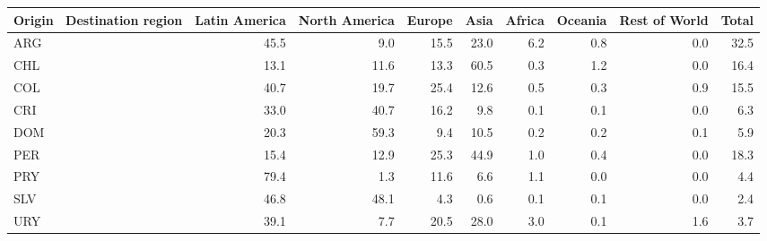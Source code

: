 \begin{tabular}{lrrrrrrrr}
\toprule
Origin \ Destination region & Latin America & North America & Europe & Asia & Africa & Oceania & Rest of World & Total \\
\midrule
ARG & 45.5 & 9.0 & 15.5 & 23.0 & 6.2 & 0.8 & 0.0 & 32.5 \\
CHL & 13.1 & 11.6 & 13.3 & 60.5 & 0.3 & 1.2 & 0.0 & 16.4 \\
COL & 40.7 & 19.7 & 25.4 & 12.6 & 0.5 & 0.3 & 0.9 & 15.5 \\
CRI & 33.0 & 40.7 & 16.2 & 9.8 & 0.1 & 0.1 & 0.0 & 6.3 \\
DOM & 20.3 & 59.3 & 9.4 & 10.5 & 0.2 & 0.2 & 0.1 & 5.9 \\
PER & 15.4 & 12.9 & 25.3 & 44.9 & 1.0 & 0.4 & 0.0 & 18.3 \\
PRY & 79.4 & 1.3 & 11.6 & 6.6 & 1.1 & 0.0 & 0.0 & 4.4 \\
SLV & 46.8 & 48.1 & 4.3 & 0.6 & 0.1 & 0.1 & 0.0 & 2.4 \\
URY & 39.1 & 7.7 & 20.5 & 28.0 & 3.0 & 0.1 & 1.6 & 3.7 \\
\bottomrule
\end{tabular}
